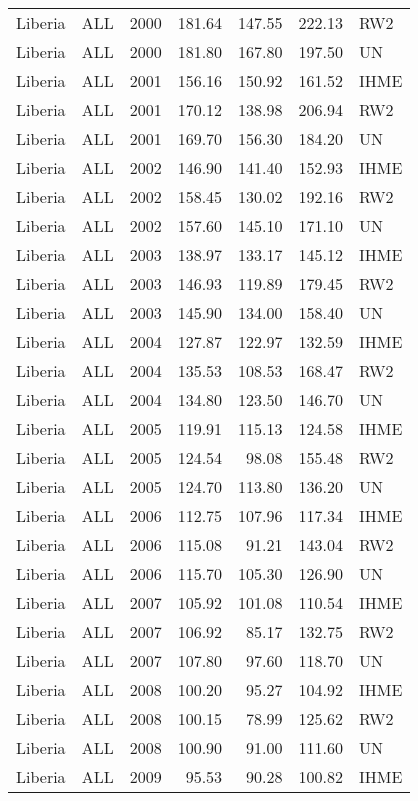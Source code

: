 \begin{longtable}{lllrrrl}
  Liberia & ALL & 2000 & 181.64 & 147.55 & 222.13 & RW2 \\ 
  Liberia & ALL & 2000 & 181.80 & 167.80 & 197.50 & UN \\ 
  Liberia & ALL & 2001 & 156.16 & 150.92 & 161.52 & IHME \\ 
  Liberia & ALL & 2001 & 170.12 & 138.98 & 206.94 & RW2 \\ 
  Liberia & ALL & 2001 & 169.70 & 156.30 & 184.20 & UN \\ 
  Liberia & ALL & 2002 & 146.90 & 141.40 & 152.93 & IHME \\ 
  Liberia & ALL & 2002 & 158.45 & 130.02 & 192.16 & RW2 \\ 
  Liberia & ALL & 2002 & 157.60 & 145.10 & 171.10 & UN \\ 
  Liberia & ALL & 2003 & 138.97 & 133.17 & 145.12 & IHME \\ 
  Liberia & ALL & 2003 & 146.93 & 119.89 & 179.45 & RW2 \\ 
  Liberia & ALL & 2003 & 145.90 & 134.00 & 158.40 & UN \\ 
  Liberia & ALL & 2004 & 127.87 & 122.97 & 132.59 & IHME \\ 
  Liberia & ALL & 2004 & 135.53 & 108.53 & 168.47 & RW2 \\ 
  Liberia & ALL & 2004 & 134.80 & 123.50 & 146.70 & UN \\ 
  Liberia & ALL & 2005 & 119.91 & 115.13 & 124.58 & IHME \\ 
  Liberia & ALL & 2005 & 124.54 & 98.08 & 155.48 & RW2 \\ 
  Liberia & ALL & 2005 & 124.70 & 113.80 & 136.20 & UN \\ 
  Liberia & ALL & 2006 & 112.75 & 107.96 & 117.34 & IHME \\ 
  Liberia & ALL & 2006 & 115.08 & 91.21 & 143.04 & RW2 \\ 
  Liberia & ALL & 2006 & 115.70 & 105.30 & 126.90 & UN \\ 
  Liberia & ALL & 2007 & 105.92 & 101.08 & 110.54 & IHME \\ 
  Liberia & ALL & 2007 & 106.92 & 85.17 & 132.75 & RW2 \\ 
  Liberia & ALL & 2007 & 107.80 & 97.60 & 118.70 & UN \\ 
  Liberia & ALL & 2008 & 100.20 & 95.27 & 104.92 & IHME \\ 
  Liberia & ALL & 2008 & 100.15 & 78.99 & 125.62 & RW2 \\ 
  Liberia & ALL & 2008 & 100.90 & 91.00 & 111.60 & UN \\ 
  Liberia & ALL & 2009 & 95.53 & 90.28 & 100.82 & IHME \\ 

\end{longtable}
